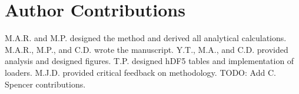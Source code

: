 % 
% 
% 
% 

\section*{Author Contributions}
M.A.R. and M.P. designed the method and derived all analytical calculations. M.A.R., M.P., and C.D. wrote the manuscript. Y.T., M.A., and C.D. provided analysis and designed figures. T.P. designed hDF5 tables and implementation of loaders. M.J.D. provided critical feedback on methodology. TODO: Add C. Spencer contributions.

